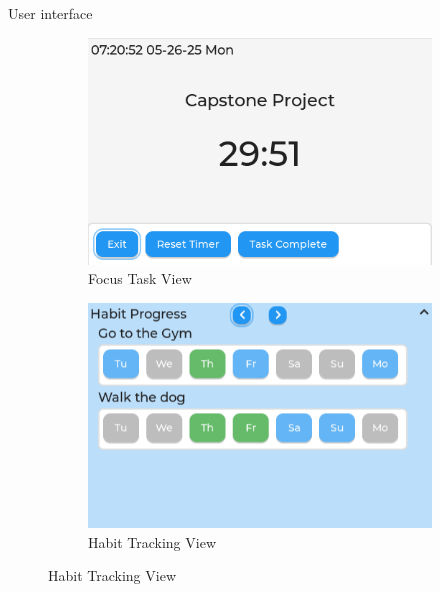 \documentclass[final]{beamer}
\newlength{\colwidth}
\begin{document}
\begin{frame}[t]
\begin{columns}[t]
\begin{column}{\colwidth}
\begin{block}{User interface}
\begin{figure}
\begin{subfigure}{0.49\textwidth}
            \includegraphics[width=\textwidth]{focusTile.png}
            \caption{Focus Task View}
          \end{subfigure}
          \hfill
          \begin{subfigure}{0.49\textwidth}
            \includegraphics[width=\textwidth]{habitTile.png}
            \caption{Habit Tracking View}
          \end{subfigure}
        \end{figure} 
      \end{block}


\end{column}
\end{columns}
\end{frame}
\end{document}
